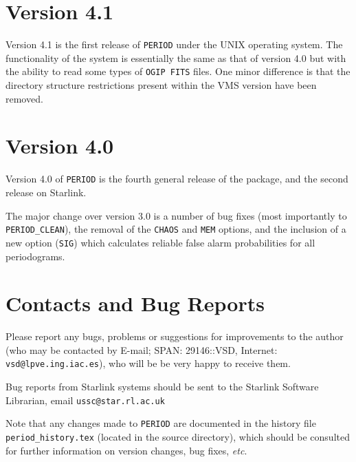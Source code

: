 \section{Version 4.1}

Version 4.1 is the first release of {\tt PERIOD} under the UNIX operating
system.  The functionality of the system is essentially the same as
that of version 4.0 but with the ability to read some types of
{\tt OGIP FITS} files.  One minor difference is that the directory
structure restrictions present within the VMS version have been
removed.

\section{Version 4.0}

Version 4.0 of {\tt PERIOD} is the fourth general release of the
package, and the second release on Starlink.

The major change over version 3.0 is a number of bug fixes (most
importantly to {\tt PERIOD\_CLEAN}), the removal of the {\tt CHAOS} and
{\tt MEM} options, and the inclusion of a new option ({\tt SIG}) which
calculates reliable false alarm probabilities for all periodograms.

\section{Contacts and Bug Reports}

Please report any bugs, problems or suggestions for improvements to the
author (who may be contacted by E-mail; SPAN: 29146::VSD, Internet: {\tt
vsd@lpve.ing.iac.es}), who will be be very happy to receive them.

Bug reports from Starlink systems should be sent to the Starlink
Software Librarian, email {\tt ussc@star.rl.ac.uk}

Note that any changes made to {\tt PERIOD} are documented in the
history file {\tt period\_history.tex} (located in the source
directory), which should be consulted for further information on
version changes, bug fixes, {\em etc}.


